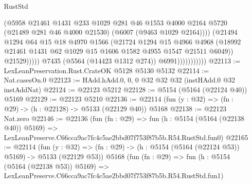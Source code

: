 \begin{lexlean}{RustStd}
\begin{coremodule}
                                    (@5958
                                      @21461
                                      @1431
                                      @233
                                      @1029
                                      @281
                                      @46
                                      @1553
                                      @4000
                                      @2164
                                      @5720
                                      (@21489 @281 @46 @4000 @21530)
                                      (@6007 (@9463 @1029 @2164))))
                                  (@21494
                                    @1294
                                    @64
                                    @15
                                    @18
                                    @4970
                                    @1566
                                    (@21724
                                      @1294
                                      @15
                                      @4966
                                      @4968
                                      (@18992
                                        @21461
                                        @1431
                                        @62
                                        @1029
                                        @15
                                        @1606
                                        @1582
                                        @4955
                                        @1547
                                        @21511
                                        @6049))
                                    @21529)))))
                          @7435
                          (@5564 (@14423 @1312 @274))
                          @6991)))))))))))
@22113 := LexLeanPreservation.Rust.CrateOK @5128 @5130 @5132
@22114 := Nat.casesOn.{0}
@22123 := HAdd.hAdd.{0, 0, 0} @32 @32 @32 (instHAdd.{0} @32 instAddNat)
@22124 := @22123 @5212
@22128 := @5154 (@5164 (@22124 @40)) @5169
@22129 := @22123 @5210
@22136 := @22114 (fun (y : @32) => (fn : @29) -> (h : @22128) -> @5133 (@22129 @40)) @5168
@22138 := @22123 Nat.zero
@22146 := @22136
    (fun (fn : @29) =>
    fun (h : @5154 (@5164 (@22138 @40)) @5169) =>
    LexLeanPreserve.C66cca9ac7fc4c5ae2bbd07f753f87b5b.R54.RustStd.fun0)
@22165 := @22114
    (fun (y : @32) => (fn : @29) -> (h : @5154 (@5164 (@22124 @53)) @5169) -> @5133 (@22129 @53))
    @5168
    (fun (fn : @29) =>
    fun (h : @5154 (@5164 (@22138 @53)) @5169) =>
    LexLeanPreserve.C66cca9ac7fc4c5ae2bbd07f753f87b5b.R54.RustStd.fun1)

\end{coremodule}
\end{lexlean}
